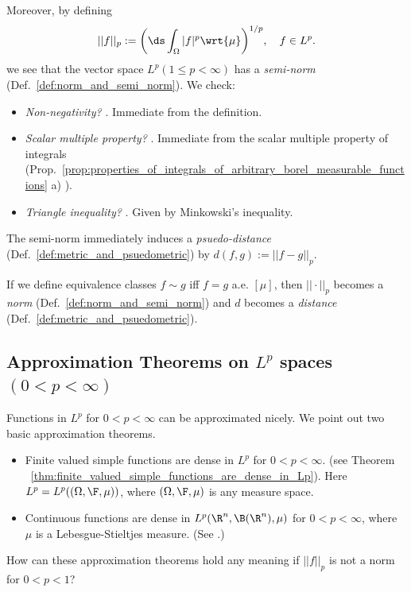 \documentclass{article} %
\newcommand{\dmu}{\wrt{\mu}}
\begin{document}
Moreover, by defining
\begin{align}
||f||_p := \bigg( \ds\int_\Omega |f|^p \dmu \bigg)^{1/p}, \quad f \in L^p.	
\end{align}
we see that the vector space $L^p (1 \leq p < \infty) $  has a \textit{semi-norm} (Def.~\ref{def:norm_and_semi_norm}). We check:
\begin{itemize}
\item \textit{Non-negativity?}  \greencheck. Immediate from the definition.
\item \textit{Scalar multiple property?}  \greencheck. Immediate from the scalar multiple property of integrals (Prop.~\ref{prop:properties_of_integrals_of_arbitrary_borel_measurable_functions} a) ). 
\item \textit{Triangle inequality?} \greencheck.  Given by Minkowski's inequality.
\end{itemize}
The semi-norm immediately induces a \textit{psuedo-distance} (Def.~\ref{def:metric_and_psuedometric}) by $d(f,g) := ||f-g||_p$.

If we define equivalence classes $f \sim g$ iff $f=g$ a.e. $[\mu]$, then $||\cdot||_p$ becomes a \textit{norm} (Def.~\ref{def:norm_and_semi_norm}) and $d$ becomes a \textit{distance} (Def.~\ref{def:metric_and_psuedometric}).   



\subsection{Approximation Theorems on $L^p$ spaces $(0<p<\infty)$}

Functions in $L^p$ for $0<p<\infty$ can be approximated nicely.  We point out two basic approximation theorems.

\begin{itemize}
\item Finite valued simple functions are dense in $L^p$ for $0<p<\infty$. (see Theorem ~\ref{thm:finite_valued_simple_functions_are_dense_in_Lp}). Here  $L^p = L^p((\Omega, \F, \mu))$, where $(\Omega, \F, \mu)$ is any measure space.

\item Continuous functions are dense in $L^p(\R^n, \B(\R^n), \mu)$ for $0<p<\infty$, where $\mu$ is a Lebesgue-Stieltjes measure.  (See \cite[Thm~2.4.14]{ash2000probability}.)
\end{itemize}

\begin{exercise}
How can these approximation theorems hold any meaning if $||f||_p$ is not a norm for $0 < p < 1$?	
\end{exercise}
\end{document}
